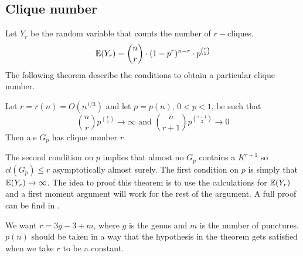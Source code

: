 \subsection{Clique number}
Let $Y_{r}$ be the random variable that counts the number of $r-$cliques.
$$\mathbb{E}(Y_{r}) = \binom{n}{r} \cdot (1-p^{r})^{n-r} \cdot p^{\binom{r}{2}}  $$
The following theorem describe the conditions to obtain a particular clique number.

\begin{theorem}
Let $r = r(n) = O(n^{1/3})$ and let $p=p(n)$, $0<p<1$, be such that
$$\binom{n}{r} p^{\binom{r}{2}} \to \infty \text{ and } \binom{n}{r+1} p^{\binom{r+1}{2}} \to 0 $$
Then a.e $G_{p}$ has clique number $r$
\end{theorem}
The second condition on $p$ implies that almost no $G_{p}$ contains a $K^{r+1}$ so $cl(G_{p})\leq r$ asymptotically almost surely. The first condition on $p$ is simply that $\mathbb{E} (Y_{r}) \to  \infty$. The idea to proof this theorem is to use the calculations for $\mathbb{E}(Y_{r})$ and a first moment argument will work for the rest of the argument. A full proof can be find in \cite[Bollobás, p.290]{Bollobas}.

We want $r = 3g-3+m$, where $g$ is the genus and $m$ is the number of punctures. $p(n)$ should be taken in a way that the hypothesis in the theorem gets satisfied when we take $r$ to be a constant.










